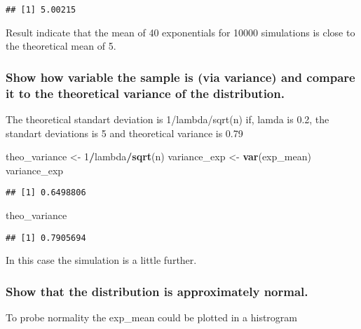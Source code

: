 \documentclass[]{article}
\newenvironment{Shaded}{\begin{snugshade}}{\end{snugshade}}
\newcommand{\KeywordTok}[1]{\textcolor[rgb]{0.13,0.29,0.53}{\textbf{#1}}}
\newcommand{\DecValTok}[1]{\textcolor[rgb]{0.00,0.00,0.81}{#1}}
\newcommand{\StringTok}[1]{\textcolor[rgb]{0.31,0.60,0.02}{#1}}
\newcommand{\OperatorTok}[1]{\textcolor[rgb]{0.81,0.36,0.00}{\textbf{#1}}}
\newcommand{\NormalTok}[1]{#1}
\begin{document}
\begin{verbatim}
## [1] 5.00215
\end{verbatim}

Result indicate that the mean of 40 exponentials for 10000 simulations
is close to the theoretical mean of 5.

\subsubsection{Show how variable the sample is (via variance) and
compare it to the theoretical variance of the
distribution.}\label{show-how-variable-the-sample-is-via-variance-and-compare-it-to-the-theoretical-variance-of-the-distribution.}

The theoretical standart deviation is 1/lambda/sqrt(n) if, lamda is 0.2,
the standart deviations is 5 and theoretical variance is 0.79

\begin{Shaded}
\begin{Highlighting}[]
\NormalTok{theo_variance <-}\StringTok{ }\DecValTok{1}\OperatorTok{/}\NormalTok{lambda}\OperatorTok{/}\KeywordTok{sqrt}\NormalTok{(n)}
\NormalTok{variance_exp <-}\StringTok{ }\KeywordTok{var}\NormalTok{(exp_mean)}
\NormalTok{variance_exp}
\end{Highlighting}
\end{Shaded}

\begin{verbatim}
## [1] 0.6498806
\end{verbatim}

\begin{Shaded}
\begin{Highlighting}[]
\NormalTok{theo_variance}
\end{Highlighting}
\end{Shaded}

\begin{verbatim}
## [1] 0.7905694
\end{verbatim}

In this case the simulation is a little further.

\subsubsection{Show that the distribution is approximately
normal.}\label{show-that-the-distribution-is-approximately-normal.}

To probe normality the exp\_mean could be plotted in a histrogram
\end{document}

